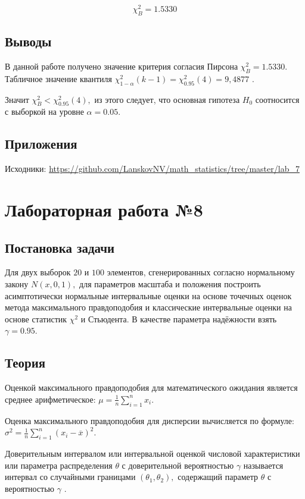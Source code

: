 \documentclass[12pt]{report}
\begin{document}
$$\chi_B^2= 1.5330$$

\section{Выводы}

В данной работе получено значение критерия согласия Пирсона $\chi_B^2 = 1.5330.$ Табличное значение квантиля  $\chi^2_{1-\alpha}(k-1)=\chi^2_{0.95}(4) = 9,4877$ \cite{chi_quant}.

Значит $\chi_B^2 < \chi^2_{0.95}(4),$ из этого следует, что основная гипотеза $H_0$ соотносится с выборкой на уровне $\alpha = 0.05.$

\section{Приложения}

Исходники: \url{https://github.com/LanskovNV/math_statistics/tree/master/lab_7}


\chapter{Лабораторная работа №8}
\section{Постановка задачи}

Для двух выборок $20$ и $100$ элементов, сгенерированных согласно нормальному закону $N(x,0,1),$ для параметров масштаба и положения построить асимптотически нормальные интервальные оценки на основе точечных оценок метода максимального правдоподобия и классические интервальные оценки на основе статистик $\chi^2$ и Стьюдента. В качестве параметра надёжности взять $\gamma = 0.95.$


\section{Теория}

Оценкой максимального правдоподобия для математического ожидания  является среднее арифметическое: $\mu=\frac{1}{n}\sum\limits_{i=1}^nx_i.$

Оценка максимального правдоподобия для дисперсии вычисляется по формуле: $\sigma^2 = \frac{1}{n}\sum\limits_{i=1}^n(x_i-\overline{x})^2.$

Доверительным интервалом или интервальной оценкой числовой характеристики или параметра распределения $\theta$ с доверительной вероятностью $\gamma$ называется интервал со случайными границами $(\theta_1,\theta_2),$ содержащий параметр $\theta$ с вероятностью $\gamma$ \cite{8_1}.
\end{document}
